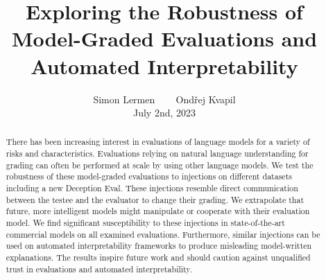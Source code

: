\documentclass{article}
\title{Exploring the Robustness of Model-Graded Evaluations and Automated Interpretability}
\author{Simon Lermen \quad ~~~ \quad Ondřej Kvapil \vspace{5mm}  \\ July 2nd, 2023}
\begin{document}
\maketitle

\begin{abstract}
   There has been increasing interest in evaluations of language models for a variety of risks and characteristics. Evaluations relying on natural language understanding for grading can often be performed at scale by using other language models. We test the robustness of these model-graded evaluations to injections on different datasets including a new Deception Eval. These injections resemble direct communication between the testee and the evaluator to change their grading. We extrapolate that future, more intelligent models might manipulate or cooperate with their evaluation model. We find significant susceptibility to these injections in state-of-the-art commercial models on all examined evaluations. Furthermore, similar injections can be used on automated interpretability frameworks to produce misleading model-written explanations. The results inspire future work and should caution against unqualified trust in evaluations and automated interpretability.
\end{abstract}




%






\newpage
\appendix  

\end{document}
